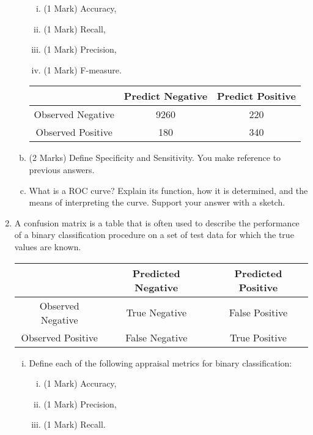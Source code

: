 \documentclass[a4paper,12pt]{article}
\begin{document}
\begin{enumerate}
\begin{enumerate}[(a)]
	\begin{enumerate}[(i)]
		\item (1 Mark) Accuracy,
		\item (1 Mark) Recall,
		\item (1 Mark) Precision,
		\item (1 Mark) F-measure.
	\end{enumerate}


 \begin{center}
	
	\begin{tabular}{|c||c|c|}
		\hline 
		& Predict Negative & Predict Positive \\ \hline  \hline 
		Observed Negative & 9260 &  220 \\ \hline 
		Observed Positive & 180 & 340 \\ \hline 
 	\end{tabular} 
 \end{center}

\item (2 Marks) Define Specificity and Sensitivity. You make reference to previous answers.
\item  What is a ROC curve? Explain its function, how it is determined, and the means of interpreting the curve. Support your answer with a sketch.
\end{enumerate}

\newpage

\item A confusion matrix is a table that is often used to describe the performance of a binary classification procedure on a set of test data for which the true values are known.
\begin{center}
\begin{tabular}{|c|c|c|}
\hline  & Predicted Negative & Predicted Positive \\ 
\hline Observed Negative & True Negative & False Positive \\ 
\hline Observed Positive & False Negative & True Positive \\ 
\hline 
\end{tabular} 
\end{center}
\begin{enumerate}[(i)]



\item Define each of the following appraisal metrics for binary classification:
\begin{enumerate}[(i)]
    \item (1 Mark) Accuracy,
    \item (1 Mark) Precision,
    \item (1 Mark) Recall.
    \end{enumerate}


\end{enumerate}
\end{enumerate}
\end{document}
